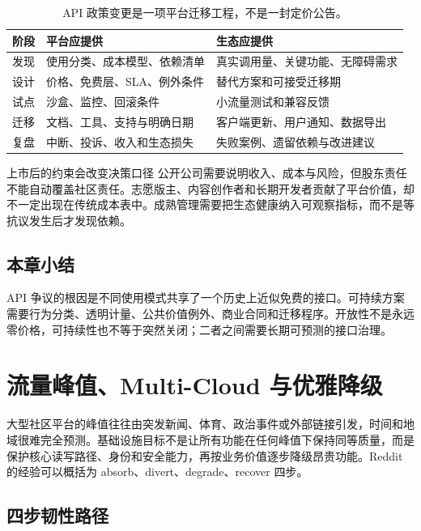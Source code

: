 \documentclass[a4paper]{article}
\begin{document}
\begin{table}[H]
\centering
\begin{tabular}{L{0.2\textwidth}L{0.34\textwidth}L{0.36\textwidth}}
\toprule
阶段 & 平台应提供 & 生态应提供 \\
\midrule
发现 & 使用分类、成本模型、依赖清单 & 真实调用量、关键功能、无障碍需求 \\
设计 & 价格、免费层、SLA、例外条件 & 替代方案和可接受迁移期 \\
试点 & 沙盒、监控、回滚条件 & 小流量测试和兼容反馈 \\
迁移 & 文档、工具、支持与明确日期 & 客户端更新、用户通知、数据导出 \\
复盘 & 中断、投诉、收入和生态损失 & 失败案例、遗留依赖与改进建议 \\
\bottomrule
\end{tabular}
\caption{API 政策变更是一项平台迁移工程，不是一封定价公告。}
\end{table}

\begin{warningbox}{上市后的约束会改变决策口径}
公开公司需要说明收入、成本与风险，但股东责任不能自动覆盖社区责任。志愿版主、内容创作者和长期开发者贡献了平台价值，却不一定出现在传统成本表中。成熟管理需要把生态健康纳入可观察指标，而不是等抗议发生后才发现依赖。
\end{warningbox}

\subsection{本章小结}

API 争议的根因是不同使用模式共享了一个历史上近似免费的接口。可持续方案需要行为分类、透明计量、公共价值例外、商业合同和迁移程序。开放性不是永远零价格，可持续性也不等于突然关闭；二者之间需要长期可预测的接口治理。

\section{流量峰值、Multi-Cloud 与优雅降级}

大型社区平台的峰值往往由突发新闻、体育、政治事件或外部链接引发，时间和地域很难完全预测。基础设施目标不是让所有功能在任何峰值下保持同等质量，而是保护核心读写路径、身份和安全能力，再按业务价值逐步降级昂贵功能。Reddit 的经验可以概括为 absorb、divert、degrade、recover 四步。

\subsection{四步韧性路径}
\end{document}
